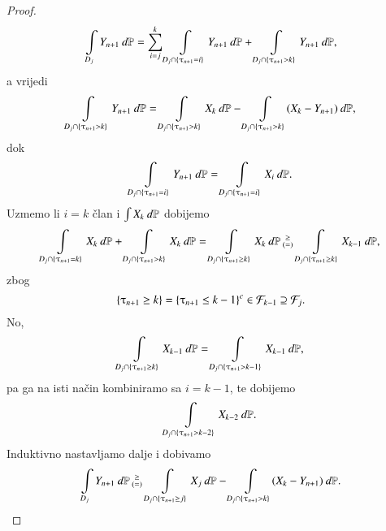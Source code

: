\begin{proof}
    \begin{equation*}
        \int\limits_{D_j} Y_{n + 1} \: d \mathbb{P} = \sum\limits_{i = j}^{k} \int\limits_{D_j \cap \{ \uptau_{n + 1} = i \}} Y_{n + 1} \: d \mathbb{P} + \int\limits_{D_j \cap \{ \uptau_{n + 1} > k\}} Y_{n + 1} \: d \mathbb{P},
    \end{equation*}
    a vrijedi
    \begin{equation*}
        \int\limits_{D_j \cap \{ \uptau_{n + 1} > k \}} Y_{n + 1} \: d \mathbb{P} = \int\limits_{D_j \cap \{ \uptau_{n + 1} > k \}} X_k \: d \mathbb{P} - \int\limits_{D_j \cap \{ \uptau_{n + 1} > k \}} (X_k - Y_{n + 1}) \: d \mathbb{P},
    \end{equation*}
    dok
    \begin{equation*}
        \int\limits_{D_j \cap \{ \uptau_{n + 1} = i \}} Y_{n + 1} \: d \mathbb{P} = \int\limits_{D_j \cap \{ \uptau_{n + 1} = i \}} X_i \: d \mathbb{P}.
    \end{equation*}
    Uzmemo li $i = k$ \v clan i $\int X_k \: d \mathbb{P}$ dobijemo
    \begin{equation*}
        \int\limits_{D_j \cap \{ \uptau_{n + 1} = k \}} X_k \: d \mathbb{P} + \int\limits_{D_j \cap \{ \uptau_{n + 1} > k \}} X_k \: d \mathbb{P} = \int\limits_{D_j \cap \{ \uptau_{n + 1} \geq k \}} X_k \: d \mathbb{P}
        \begin{smallmatrix}
            \geq\\
            (=)
        \end{smallmatrix}
        \int\limits_{D_j \cap \{ \uptau_{n + 1} \geq k \}} X_{k - 1} \: d \mathbb{P},
    \end{equation*}
    zbog
    \begin{equation*}
        \{ \uptau_{n + 1} \geq k \} = \{ \uptau_{n + 1} \leq k - 1 \}^c \in \mathcal{F}_{k - 1} \supseteq \mathcal{F}_j.
    \end{equation*}
    No,
    \begin{equation*}
        \int\limits_{D_j \cap \{ \uptau_{n + 1} \geq k \}} X_{k - 1} \: d \mathbb{P} = \int\limits_{D_j \cap \{ \uptau_{n + 1} > k - 1 \}} X_{k - 1} \: d \mathbb{P},
    \end{equation*}
    pa ga na isti na\v cin kombiniramo sa $i = k - 1$, te dobijemo
    \begin{equation*}
        \int\limits_{D_j \cap \{ \uptau_{n + 1} > k - 2 \}} X_{k - 2} \: d \mathbb{P}.
    \end{equation*}
    Induktivno nastavljamo dalje i dobivamo
    \begin{equation*}
        \int\limits_{D_j} Y_{n + 1} \: d \mathbb{P}
        \begin{smallmatrix}
            \geq\\
            (=)
        \end{smallmatrix}
        \int\limits_{D_j \cap \{ \uptau_{n + 1} \geq j \}} X_j \: d \mathbb{P} - \int\limits_{D_j \cap \{ \uptau_{n + 1} > k \}} (X_k - Y_{n + 1}) \: d \mathbb{P}.
    \end{equation*}


\end{proof}
